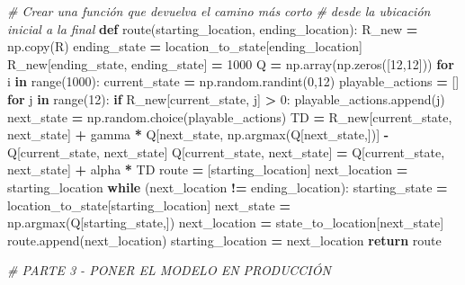 \documentclass[
]{book}
\newenvironment{Shaded}{\begin{snugshade}}{\end{snugshade}}
\newcommand{\BuiltInTok}[1]{#1}
\newcommand{\CommentTok}[1]{\textcolor[rgb]{0.56,0.35,0.01}{\textit{#1}}}
\newcommand{\ControlFlowTok}[1]{\textcolor[rgb]{0.13,0.29,0.53}{\textbf{#1}}}
\newcommand{\DecValTok}[1]{\textcolor[rgb]{0.00,0.00,0.81}{#1}}
\newcommand{\KeywordTok}[1]{\textcolor[rgb]{0.13,0.29,0.53}{\textbf{#1}}}
\newcommand{\NormalTok}[1]{#1}
\newcommand{\OperatorTok}[1]{\textcolor[rgb]{0.81,0.36,0.00}{\textbf{#1}}}
\begin{document}
\begin{Shaded}
\begin{Highlighting}[]
\CommentTok{\# Crear una función que devuelva el camino más corto }
\CommentTok{\# desde la ubicación inicial a la final}
\KeywordTok{def}\NormalTok{ route(starting\_location, ending\_location):}
\NormalTok{    R\_new }\OperatorTok{=}\NormalTok{ np.copy(R)}
\NormalTok{    ending\_state }\OperatorTok{=}\NormalTok{ location\_to\_state[ending\_location]}
\NormalTok{    R\_new[ending\_state, ending\_state] }\OperatorTok{=} \DecValTok{1000}
\NormalTok{    Q }\OperatorTok{=}\NormalTok{ np.array(np.zeros([}\DecValTok{12}\NormalTok{,}\DecValTok{12}\NormalTok{]))}
    \ControlFlowTok{for}\NormalTok{ i }\KeywordTok{in} \BuiltInTok{range}\NormalTok{(}\DecValTok{1000}\NormalTok{):}
\NormalTok{        current\_state }\OperatorTok{=}\NormalTok{ np.random.randint(}\DecValTok{0}\NormalTok{,}\DecValTok{12}\NormalTok{)}
\NormalTok{        playable\_actions }\OperatorTok{=}\NormalTok{ []}
        \ControlFlowTok{for}\NormalTok{ j }\KeywordTok{in} \BuiltInTok{range}\NormalTok{(}\DecValTok{12}\NormalTok{):}
            \ControlFlowTok{if}\NormalTok{ R\_new[current\_state, j] }\OperatorTok{\textgreater{}} \DecValTok{0}\NormalTok{:}
\NormalTok{                playable\_actions.append(j)}
\NormalTok{        next\_state }\OperatorTok{=}\NormalTok{ np.random.choice(playable\_actions)}
\NormalTok{        TD }\OperatorTok{=}\NormalTok{ R\_new[current\_state, next\_state]}
             \OperatorTok{+}\NormalTok{ gamma }\OperatorTok{*}\NormalTok{ Q[next\_state, np.argmax(Q[next\_state,])]}
             \OperatorTok{{-}}\NormalTok{ Q[current\_state, next\_state]}
\NormalTok{        Q[current\_state, next\_state] }\OperatorTok{=}\NormalTok{ Q[current\_state, next\_state] }\OperatorTok{+} 
\NormalTok{                                       alpha }\OperatorTok{*}\NormalTok{ TD}
\NormalTok{    route }\OperatorTok{=}\NormalTok{ [starting\_location]}
\NormalTok{    next\_location }\OperatorTok{=}\NormalTok{ starting\_location}
    \ControlFlowTok{while}\NormalTok{ (next\_location }\OperatorTok{!=}\NormalTok{ ending\_location):}
\NormalTok{        starting\_state }\OperatorTok{=}\NormalTok{ location\_to\_state[starting\_location]}
\NormalTok{        next\_state }\OperatorTok{=}\NormalTok{ np.argmax(Q[starting\_state,])}
\NormalTok{        next\_location }\OperatorTok{=}\NormalTok{ state\_to\_location[next\_state]}
\NormalTok{        route.append(next\_location)}
\NormalTok{        starting\_location }\OperatorTok{=}\NormalTok{ next\_location}
    \ControlFlowTok{return}\NormalTok{ route}

\CommentTok{\# PARTE 3 {-} PONER EL MODELO EN PRODUCCIÓN}


\end{Highlighting}
\end{Shaded}
\end{document}
